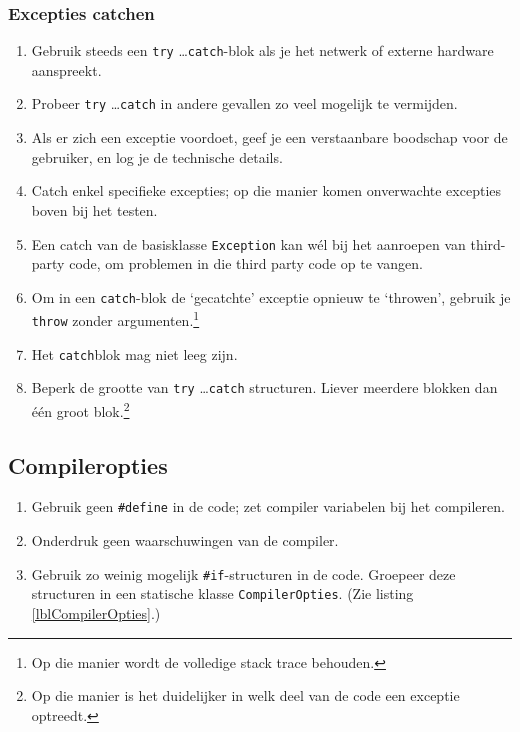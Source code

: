 \documentclass[a4paper,11pt]{article}
\begin{document}
\subsubsection{Excepties catchen}
\begin{enumerate}[resume]
\item Gebruik steeds een \lstinline !try! \ldots \lstinline !catch!-blok
als je het netwerk of externe hardware aanspreekt.
\item Probeer \lstinline !try! \ldots \lstinline !catch! in andere
gevallen zo veel mogelijk te vermijden.
\item Als er zich een exceptie voordoet, geef je een verstaanbare boodschap voor de gebruiker,
en log je de technische details.
\item Catch enkel specifieke excepties; op die manier komen onverwachte
excepties boven bij het testen.
\item Een catch van de basisklasse \lstinline !Exception! kan w\'el bij het aanroepen van
third-party code, om problemen in die third party code op te vangen.
\item Om in een \lstinline !catch!-blok de `gecatchte' exceptie opnieuw te `throwen', gebruik je
\lstinline !throw! zonder argumenten.\footnote{Op die manier wordt de volledige stack trace
behouden.}
\item Het \lstinline !catch!blok mag niet leeg zijn.
\item Beperk de grootte van \lstinline !try! \ldots \lstinline !catch! structuren.  Liever
meerdere blokken dan \'e\'en groot blok.\footnote{Op die manier is het duidelijker in welk deel
van de code een exceptie optreedt.}
\end{enumerate}


\subsection{Compileropties}
\begin{enumerate}[resume]
\item Gebruik geen \lstinline !#define! in de code; zet compiler variabelen
bij het compileren.
\item Onderdruk geen waarschuwingen van de compiler.
\item Gebruik zo weinig mogelijk 
\lstinline !#if!-structuren in de code.  Groepeer deze structuren in een statische klasse
\lstinline !CompilerOpties!.  (Zie listing \ref{lblCompilerOpties}.)
\end{enumerate}
\end{document}
